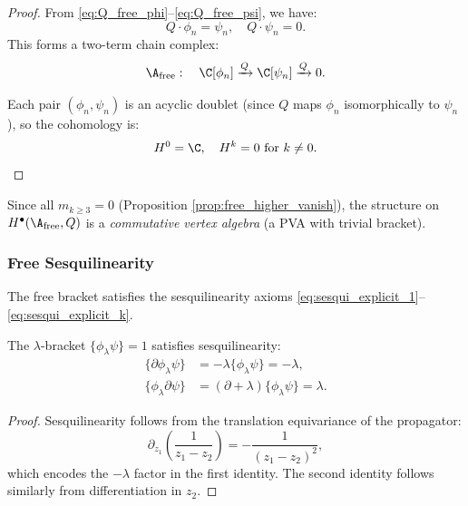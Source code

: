 \begin{proof}
From \eqref{eq:Q_free_phi}--\eqref{eq:Q_free_psi}, we have:
\begin{equation}
Q \cdot \phi_n = \psi_n, \quad Q \cdot \psi_n = 0.
\end{equation}
This forms a two-term chain complex:
\begin{equation}
\A_{\text{free}} : \quad \C[\phi_n] \xrightarrow{Q} \C[\psi_n] \xrightarrow{Q} 0.
\end{equation}

Each pair $(\phi_n, \psi_n)$ is an acyclic doublet (since $Q$ maps $\phi_n$ isomorphically to $\psi_n$), so the cohomology is:
\begin{equation}
H^0 = \C, \quad H^{k} = 0 \text{ for } k \neq 0.
\end{equation}
\end{proof}
Since all $m_{k \geq 3} = 0$ (Proposition \ref{prop:free_higher_vanish}), the structure on $H^\bullet(\A_{\text{free}}, Q)$ is a \emph{commutative vertex algebra} (a PVA with trivial bracket).

\subsubsection{Free Sesquilinearity}

The free bracket satisfies the sesquilinearity axioms
\eqref{eq:sesqui_explicit_1}--\eqref{eq:sesqui_explicit_k}.
\begin{lemma}
The $\lambda$-bracket $\{\phi_\lambda \psi\} = 1$ satisfies sesquilinearity:
\begin{align}
\{\partial \phi_\lambda \psi\} &= -\lambda \{\phi_\lambda \psi\} = -\lambda, \\
\{\phi_\lambda \partial \psi\} &= (\partial + \lambda) \{\phi_\lambda \psi\} = \lambda.
\end{align}
\end{lemma}

\begin{proof}
Sesquilinearity follows from the translation equivariance of the propagator:
\begin{equation}
\partial_{z_1} \left( \frac{1}{z_1 - z_2} \right) = -\frac{1}{(z_1 - z_2)^2},
\end{equation}
which encodes the $-\lambda$ factor in the first identity. The second identity follows similarly from differentiation in $z_2$.
\end{proof}

